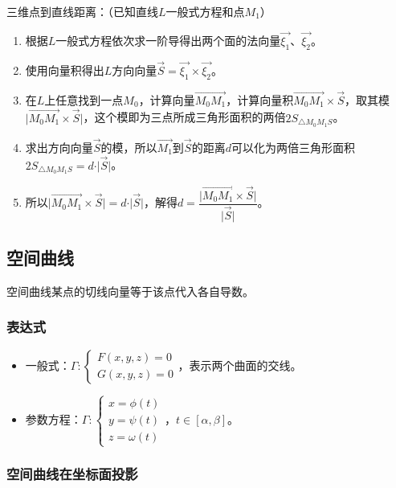 三维点到直线距离：（已知直线$L$一般式方程和点$M_1$）

\begin{enumerate}
    \item 根据$L$一般式方程依次求一阶导得出两个面的法向量$\vec{\xi_1}$、$\vec{\xi_2}$。
    \item 使用向量积得出$L$方向向量$\vec{S}=\vec{\xi_1}\times\vec{\xi_2}$。
    \item 在$L$上任意找到一点$M_0$，计算向量$\overrightarrow{M_0M_1}$，计算向量积$\overrightarrow{M_0M_1}\times\vec{S}$，取其模$\vert\overrightarrow{M_0M_1}\times\vec{S}\vert$，这个模即为三点所成三角形面积的两倍$2S_{\triangle M_0M_1S}$。
    \item 求出方向向量$\vec{S}$的模，所以$\vec{M_1}$到$\vec{S}$的距离$d$可以化为两倍三角形面积$2S_{\triangle M_0M_1S}=d\cdot\vert\vec{S}\vert$。
    \item 所以$\vert\overrightarrow{M_0M_1}\times\vec{S}\vert=d\cdot\vert\vec{S}\vert$，解得$d=\dfrac{\vert\overrightarrow{M_0M_1}\times\vec{S}\vert}{\vert\vec{S}\vert}$。
\end{enumerate}

\subsection{空间曲线}

空间曲线某点的切线向量等于该点代入各自导数。

\subsubsection{表达式}

\begin{itemize}
    \item 一般式：$\varGamma:\left\{\begin{array}{l}
        F(x,y,z)=0 \\
        G(x,y,z)=0
    \end{array}\right.$，表示两个曲面的交线。
    \item 参数方程：$\varGamma:\left\{\begin{array}{l}
        x=\phi(t) \\
        y=\psi(t) \\
        z=\omega(t)
    \end{array}\right.$，$t\in[\alpha,\beta]$。
\end{itemize}

\subsubsection{空间曲线在坐标面投影}

